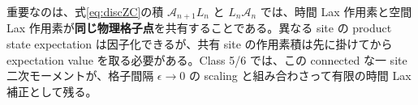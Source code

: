 重要なのは、式\eqref{eq:discZC}の積 $\mathcal A_{n+1}L_n$ と $L_n\mathcal A_n$ では、時間 Lax 作用素と空間 Lax 作用素が\textbf{同じ物理格子点}を共有することである。異なる site の product state expectation は因子化できるが、共有 site の作用素積は先に掛けてから expectation value を取る必要がある。Class 5/6 では、この connected な一 site 二次モーメントが、格子間隔 $\epsilon\to0$ の scaling と組み合わさって有限の時間 Lax 補正として残る。

